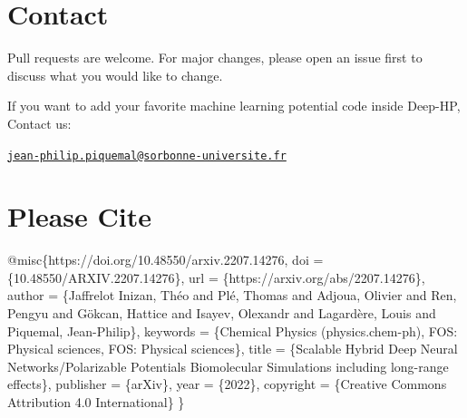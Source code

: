 \section*{Contact}

Pull requests are welcome. For major changes, please open an issue first to discuss what you would like to change.\par


If you want to add your favorite machine learning potential code inside Deep-\/\-H\-P, Contact us\-:
\begin{DoxyItemize}
\item \href{mailto:jean-philip.piquemal@sorbonne-universite.fr}{\tt jean-\/philip.\-piquemal@sorbonne-\/universite.\-fr}
\end{DoxyItemize}

\section*{Please Cite}


\begin{DoxyCode}
@misc\{https:\textcolor{comment}{//doi.org/10.48550/arxiv.2207.14276,}
  doi = \{10.48550/ARXIV.2207.14276\},
  url = \{https:\textcolor{comment}{//arxiv.org/abs/2207.14276\},}
  author = \{Jaffrelot Inizan, Théo and Plé, Thomas and Adjoua, Olivier and Ren, Pengyu and Gökcan, Hattice 
      and Isayev, Olexandr and Lagardère, Louis and Piquemal, Jean-Philip\},
  keywords = \{Chemical Physics (physics.chem-ph), FOS: Physical sciences, FOS: Physical sciences\},
  title = \{Scalable Hybrid Deep Neural Networks/Polarizable Potentials Biomolecular Simulations including \textcolor{keywordtype}{
      long}-range effects\},
  publisher = \{arXiv\},
  year = \{2022\},
  copyright = \{Creative Commons Attribution 4.0 International\}
\}
\end{DoxyCode}
 
